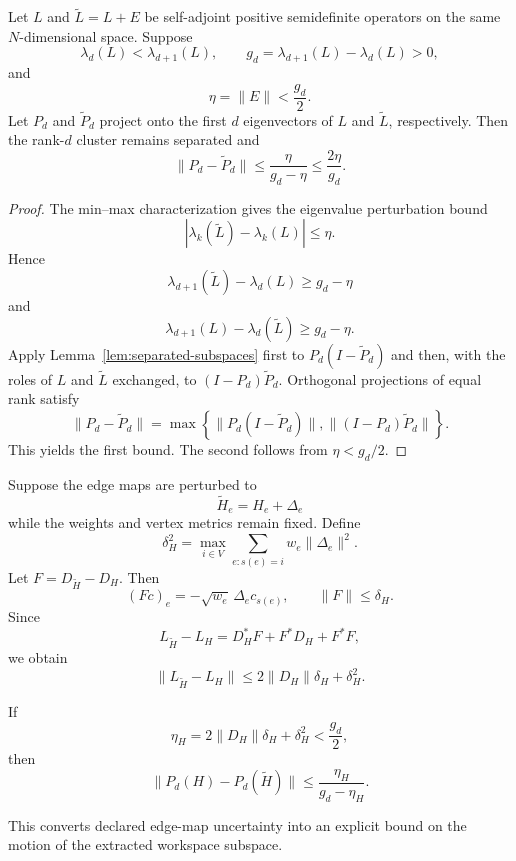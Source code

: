 \begin{theorem}\label{thm:spectral-stability}
Let \(L\) and \(\widetilde L=L+E\) be self-adjoint positive semidefinite
operators on the same \(N\)-dimensional space. Suppose
\[
\lambda_d(L)<\lambda_{d+1}(L),
\qquad
g_d=\lambda_{d+1}(L)-\lambda_d(L)>0,
\]
and
\[
\eta=\|E\|<\frac{g_d}{2}.
\]
Let \(P_d\) and \(\widetilde P_d\) project onto the first \(d\) eigenvectors
of \(L\) and \(\widetilde L\), respectively. Then the rank-\(d\) cluster
remains separated and
\[
\boxed{
\|P_d-\widetilde P_d\|
\leq
\frac{\eta}{g_d-\eta}
\leq
\frac{2\eta}{g_d}.
}
\]
\end{theorem}

\begin{proof}
The min--max characterization gives the eigenvalue perturbation bound
\[
|\lambda_k(\widetilde L)-\lambda_k(L)|\leq\eta.
\]
Hence
\[
\lambda_{d+1}(\widetilde L)-\lambda_d(L)
\geq g_d-\eta
\]
and
\[
\lambda_{d+1}(L)-\lambda_d(\widetilde L)
\geq g_d-\eta.
\]
Apply Lemma~\ref{lem:separated-subspaces} first to
\(P_d(I-\widetilde P_d)\) and then, with the roles of \(L\) and
\(\widetilde L\) exchanged, to \((I-P_d)\widetilde P_d\). Orthogonal
projections of equal rank satisfy
\[
\|P_d-\widetilde P_d\|
=
\max\left\{
\|P_d(I-\widetilde P_d)\|,
\|(I-P_d)\widetilde P_d\|
\right\}.
\]
This yields the first bound. The second follows from \(\eta<g_d/2\).
\end{proof}


Suppose the edge maps are perturbed to
\[
\widetilde H_e=H_e+\Delta_e
\]
while the weights and vertex metrics remain fixed. Define
\[
\boxed{
\delta_H^2
=
\max_{i\in V}
\sum_{e:s(e)=i}w_e\|\Delta_e\|^2.
}
\]
Let \(F=D_{\widetilde H}-D_H\). Then
\[
(Fc)_e=-\sqrt{w_e}\,\Delta_ec_{s(e)},
\qquad
\|F\|\leq\delta_H.
\]
Since
\[
L_{\widetilde H}-L_H
=D_H^*F+F^*D_H+F^*F,
\]
we obtain
\[
\boxed{
\|L_{\widetilde H}-L_H\|
\leq
2\|D_H\|\delta_H+\delta_H^2.
}
\]

\begin{corollary}\label{cor:edge-stability}
If
\[
\eta_H=2\|D_H\|\delta_H+\delta_H^2
<\frac{g_d}{2},
\]
then
\[
\boxed{
\|P_d(H)-P_d(\widetilde H)\|
\leq
\frac{\eta_H}{g_d-\eta_H}.
}
\]
\end{corollary}

This converts declared edge-map uncertainty into an explicit bound on the
motion of the extracted workspace subspace.

